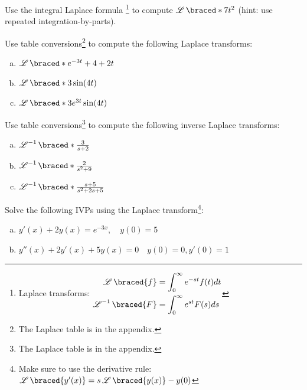     \begin{question}
      Use the integral Laplace formula
      \footnote{ Laplace transforms:
        \(
        \begin{aligned}
        \laplace\braced{f} &= \int_{0}^{\infty} e^{-st} f(t)dt  \\
        \laplace^{-1}\braced{F} &= \int_{0}^{\infty} e^{st} F(s)ds
      \end{aligned}
        \)}  to compute \(\laplace\braced*{7 t^{2}}\) (hint: use repeated integration-by-parts).
        \solspace{0.2in}
    \end{question}

    \begin{question}
      Use table conversions\footnote{The Laplace table is in the appendix.} to compute the following Laplace transforms:
      \begin{enumerate}[(a)]
        \item \(\laplace\braced*{e^{-3t} + 4+2t} \) \solspace{0.2in}
        \item \(\laplace\braced*{3 \sin(4t)} \) \solspace{0.2in}
        \item \(\laplace\braced*{3 e^{3t}\sin(4t)} \) \solspace{0.2in}
      \end{enumerate}
    \end{question}

    \begin{question}
      Use table conversions\footnote{The Laplace table is in the appendix.} to compute the following inverse Laplace transforms:
      \begin{enumerate}[(a)]
        \item \(\laplace^{-1}\braced*{\frac{3}{s+2}} \) \solspace{0.2in}
        \item \(\laplace^{-1}\braced*{\frac{2}{s^{2} + 9}} \) \solspace{0.2in}
        \item \(\laplace^{-1}\braced*{\frac{s+5}{ s^{2} + 2s + 5}} \) \solspace{0.2in}
      \end{enumerate}
    \end{question}

    \begin{question}
      Solve the following IVPs using the Laplace transform\footnote{Make sure to use the derivative rule:\(\laplace\braced{y'(x)} = s\laplace\braced{y(x)} - y(0)\)}:
      \begin{enumerate}[(a)]
        \item \(y'(x) + 2y(x) = e^{-3x}, \quad y(0) = 5\)\solspace{0.2in}
        \item \(y''(x) + 2y'(x) + 5y(x) = 0 \quad y(0) = 0, y'(0)=1\)\solspace{0.2in}
      \end{enumerate}
    \end{question}



